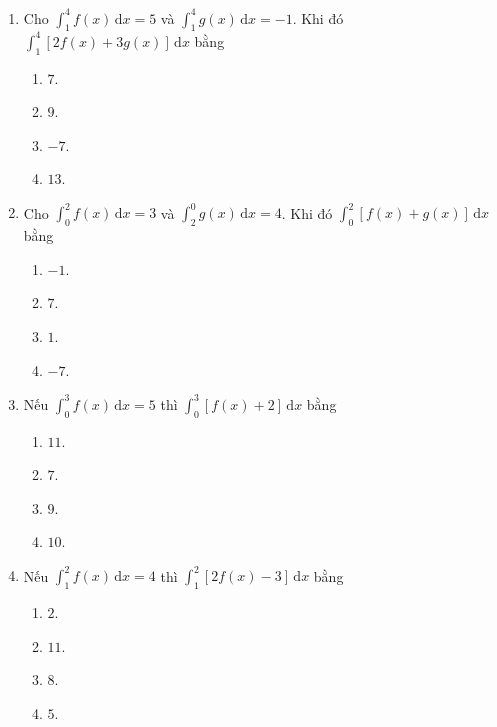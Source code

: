 \documentclass[12pt]{article}
\begin{document}
\begin{enumerate}[label=\textbf{Câu \arabic*.}]
		\item Cho $\displaystyle \int_1^4 f(x)\,\mathrm{d}x = 5$ và $\displaystyle \int_1^4 g(x)\,\mathrm{d}x = -1$. Khi đó $\displaystyle \int_1^4 [2f(x) + 3g(x)]\,\mathrm{d}x$ bằng
		\begin{multicols}{4}
			\begin{enumerate}[label=\textbf{\Alph*.}]
				\item $7$.
				\item $9$.
				\item $-7$.
				\item $13$.
			\end{enumerate}
		\end{multicols}
		
		\item Cho $\displaystyle \int_0^2 f(x)\,\mathrm{d}x = 3$ và $\displaystyle \int_2^0 g(x)\,\mathrm{d}x = 4$. Khi đó $\displaystyle \int_0^2 [f(x) + g(x)]\,\mathrm{d}x$ bằng
		\begin{multicols}{4}
			\begin{enumerate}[label=\textbf{\Alph*.}]
				\item $-1$.
				\item $7$.
				\item $1$.
				\item $-7$.
			\end{enumerate}
		\end{multicols}
		
		\item Nếu $\displaystyle \int_0^3 f(x)\,\mathrm{d}x = 5$ thì $\displaystyle \int_0^3 [f(x) + 2]\,\mathrm{d}x$ bằng
		\begin{multicols}{4}
			\begin{enumerate}[label=\textbf{\Alph*.}]
				\item $11$.
				\item $7$.
				\item $9$.
				\item $10$.
			\end{enumerate}
		\end{multicols}
		
		\item Nếu $\displaystyle \int_1^2 f(x)\,\mathrm{d}x = 4$ thì $\displaystyle \int_1^2 [2f(x) - 3]\,\mathrm{d}x$ bằng
		\begin{multicols}{4}
			\begin{enumerate}[label=\textbf{\Alph*.}]
				\item $2$.
				\item $11$.
				\item $8$.
				\item $5$.
			\end{enumerate}
		\end{multicols}
		

\end{enumerate}
\end{document}
